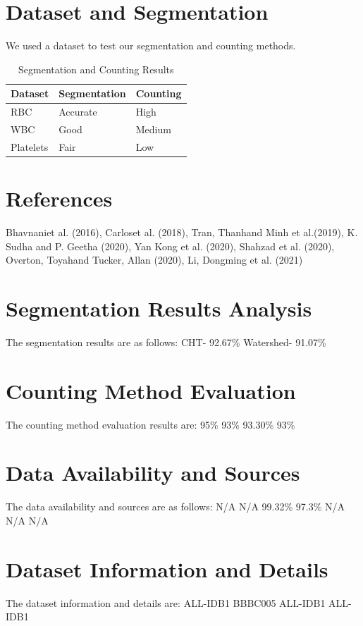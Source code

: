 \documentclass[conference]{IEEEtran}
\begin{document}
\section{Dataset and Segmentation}
We used a dataset to test our segmentation and counting methods.
\begin{table}[htbp]
\centering
\caption{Segmentation and Counting Results}
\label{tab:results}
\begin{tabular}{lll}
\hline
Dataset & Segmentation & Counting \\
\hline
RBC & Accurate & High \\
WBC & Good & Medium \\
Platelets & Fair & Low \\
\hline
\end{tabular}
\end{table}
\section{References}
Bhavnaniet al. (2016), Carloset al. (2018), Tran, Thanhand Minh et al.(2019), K. Sudha and P. Geetha (2020), Yan Kong et al. (2020), Shahzad et al. (2020), Overton, Toyahand Tucker, Allan (2020), Li, Dongming et al. (2021)

\section{Segmentation Results Analysis}
The segmentation results are as follows: 
CHT- 92.67\% 
Watershed- 91.07\%
\section{Counting Method Evaluation}
The counting method evaluation results are: 
95\% 
93\% 
93.30\% 
93\% 
\section{Data Availability and Sources}
The data availability and sources are as follows: 
N/A 
N/A 
99.32\% 
97.3\% 
N/A 
N/A 
N/A 
\section{Dataset Information and Details}
The dataset information and details are: 
ALL-IDB1 
BBBC005 
ALL-IDB1 
ALL-IDB1
\end{document}
